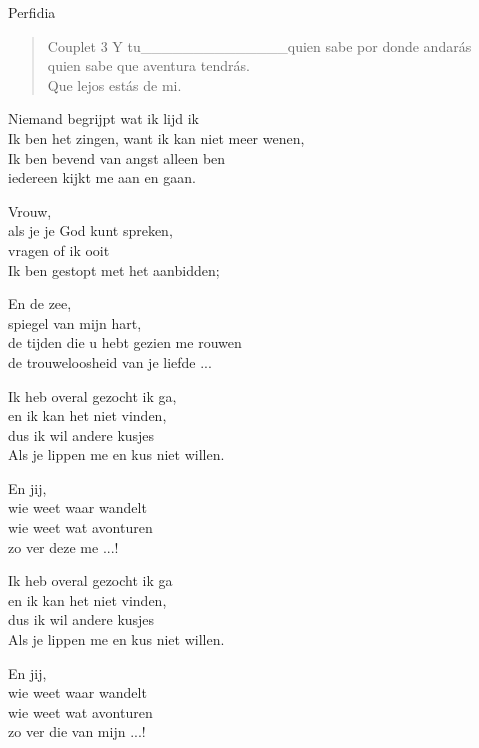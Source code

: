 \begin{song}[bolero]{Perfidia}
\begin{verse}{Couplet 3}
Y\hspace{1em} tu\_{}\_{}\_{}\_{}\_{}\_{}\_{}\_{}\_{}\_{}\_{}\_{}\_{}\_{}quien sabe por donde andar\'{a}s \hspace{3em}\\
quien sabe que aventura tendr\'{a}s.\\
Que lejos est\'{a}s de mi. \hspace{3em} \hspace{3em} \hspace{3em}
\end{verse}

\end{song}

\clearpage
\begin{translation}
Niemand begrijpt wat ik lijd ik\\
Ik ben het zingen, want ik kan niet meer wenen,\\
Ik ben bevend van angst alleen ben\\
iedereen kijkt me aan en gaan.\vspace{\wlskip}

Vrouw,\\
als je je God kunt spreken,\\
vragen of ik ooit\\
Ik ben gestopt met het aanbidden;\vspace{\wlskip}

En de zee,\\
spiegel van mijn hart,\\
de tijden die u hebt gezien me rouwen\\
de trouweloosheid van je liefde ...\vspace{\wlskip}

Ik heb overal gezocht ik ga,\\
en ik kan het niet vinden,\\
dus ik wil andere kusjes\\
Als je lippen me en kus niet willen.\vspace{\wlskip}

En jij,\\
wie weet waar wandelt\\
wie weet wat avonturen\\
zo ver deze me ...!\vspace{\wlskip}

Ik heb overal gezocht ik ga\\
en ik kan het niet vinden,\\
dus ik wil andere kusjes\\
Als je lippen me en kus niet willen.\vspace{\wlskip}

En jij,\\
wie weet waar wandelt\\
wie weet wat avonturen\\
zo ver die van mijn ...!
\end{translation}
